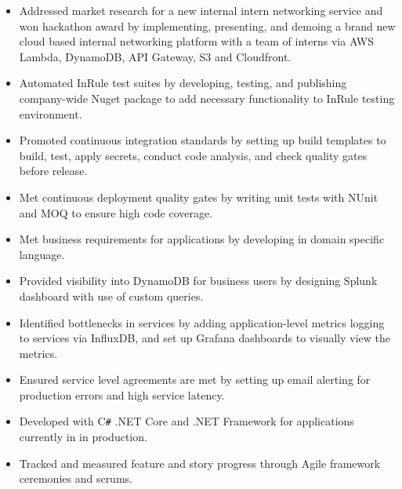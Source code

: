 \documentclass[overlapped]{res}
\begin{document}
\begin{resume}
\begin{itemize}
                  \item Addressed market research for a new internal intern networking service
                  and won hackathon award
                  by implementing, presenting, and demoing 
                  a brand new cloud based internal
                   networking platform with a team of interns
                   via
                   AWS Lambda, DynamoDB, API Gateway, S3 and Cloudfront.

                  \item Automated InRule test suites by developing, testing, and publishing
                  company-wide Nuget package to add
                  necessary functionality to InRule testing environment.

                  \item Promoted continuous integration standards by setting up build templates to build,
                  test, apply secrets, conduct code analysis,
                  and check quality gates before release.

                  \item Met continuous deployment quality gates by writing unit tests
                  with NUnit and MOQ to ensure high code coverage.

                  \item Met business requirements for applications by developing in domain
                  specific language.

                  \item Provided visibility into DynamoDB for business users
                  by designing Splunk dashboard with use of
                  custom queries.

                  \item Identified bottlenecks in services by adding application-level
                  metrics logging to services via InfluxDB,
                  and set up Grafana dashboards to visually view the metrics.

                  \item Ensured service level agreements are met by setting up email alerting 
                  for production errors and high service latency.

                  \item Developed with C\texttt{\#} .NET Core and .NET Framework
                  for applications currently in in production.

                  \item Tracked and measured feature and story progress through
                  Agile framework ceremonies and scrums.


\end{itemize}
\end{resume}
\end{document}
